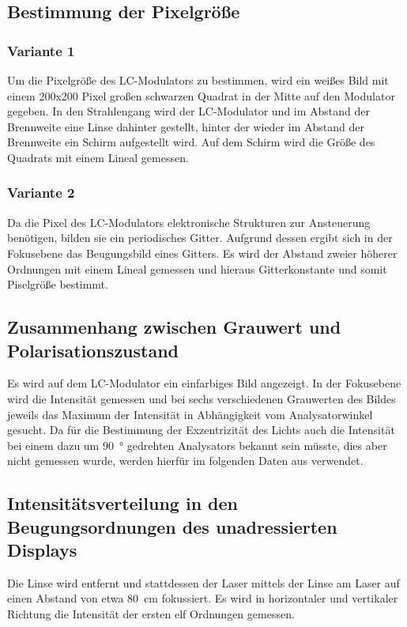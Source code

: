 \documentclass[
	a4paper,
	12pt,
	pagesize,
	ngerman
]{scrartcl}
\begin{document}
	\subsection{Bestimmung der Pixelgröße}
		\subsubsection*{Variante 1}
		Um die Pixelgröße des LC-Modulators zu bestimmen, wird ein weißes Bild mit einem 200x200 Pixel großen schwarzen Quadrat in der Mitte auf den Modulator gegeben.
		In den Strahlengang wird der LC-Modulator und im Abstand der Brennweite eine Linse dahinter gestellt, hinter der wieder im Abstand der Brennweite ein Schirm aufgestellt wird.
		Auf dem Schirm wird die Größe des Quadrats mit einem Lineal gemessen. %
		\subsubsection*{Variante 2}
		Da die Pixel des LC-Modulators elektronische Strukturen zur Ansteuerung benötigen, bilden sie ein periodisches Gitter. %
		Aufgrund dessen ergibt sich in der Fokusebene das Beugungsbild eines Gitters.
		Es wird der Abstand zweier höherer Ordnungen mit einem Lineal gemessen und hieraus Gitterkonstante und somit Piselgröße bestimmt.


	\subsection{Zusammenhang zwischen Grauwert und Polarisationszustand}

		Es wird auf dem LC-Modulator ein einfarbiges Bild angezeigt. %
		In der Fokusebene wird die Intensität gemessen und bei sechs verschiedenen Grauwerten des Bildes jeweils das Maximum der Intensität in Abhängigkeit vom Analysatorwinkel gesucht.
		Da für die Bestimmung der Exzentrizität des Lichts auch die Intensität bei einem dazu um \SI{90}{\degree} gedrehten Analysators bekannt sein müsste, dies aber nicht gemessen wurde, werden hierfür im folgenden Daten aus \cite{JTZ} verwendet.

	\subsection{Intensitätsverteilung in den Beugungsordnungen des unadressierten Displays} %
	Die Linse wird entfernt und stattdessen der Laser mittels der Linse am Laser auf einen Abstand von etwa \SI{80}{\centi \meter} fokussiert. %
	Es wird in horizontaler und vertikaler Richtung die Intensität der ersten elf Ordnungen gemessen. %
\end{document}
